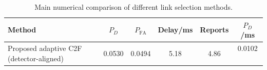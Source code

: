 \begin{table}[t]
    \centering
    \caption{Main numerical comparison of different link selection methods.}
    \label{tab:main_summary}
    \begin{tabular}{l c c c c c}
        \hline
        Method & $P_D$ & $P_{\mathrm{FA}}$ & Delay/ms & Reports & $P_D$/ms \\
        \hline
        Proposed adaptive C2F (detector-aligned) & 0.0530 & 0.0494 & 5.18 & 4.86 & 0.0102 \
        \hline
    \end{tabular}
\end{table}
